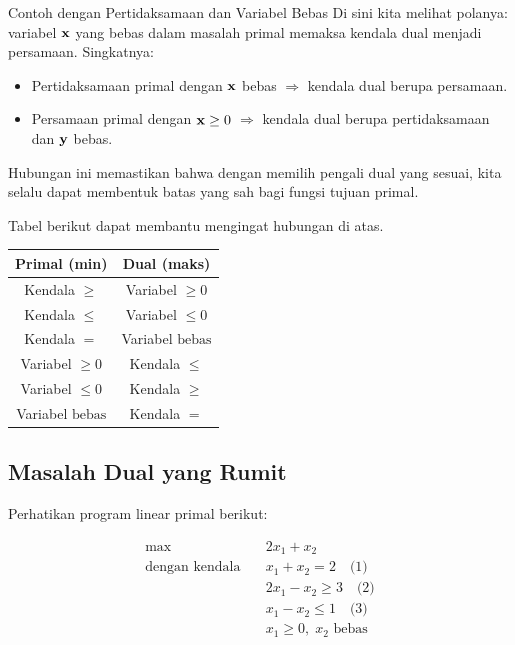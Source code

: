 \begin{example}{Contoh dengan Pertidaksamaan dan Variabel Bebas}{}
Di sini kita melihat polanya: variabel $\mathbf{x}$ yang bebas dalam masalah primal memaksa kendala dual menjadi persamaan. Singkatnya:
\begin{itemize}
\item Pertidaksamaan primal dengan $\mathbf{x}$ bebas $\Rightarrow$ kendala dual berupa persamaan.
\item Persamaan primal dengan $\mathbf{x} \geq 0$ $\Rightarrow$ kendala dual berupa pertidaksamaan dan $\mathbf{y}$ bebas.
\end{itemize}

Hubungan ini memastikan bahwa dengan memilih pengali dual yang sesuai, kita selalu dapat membentuk batas yang sah bagi fungsi tujuan primal.

Tabel berikut dapat membantu mengingat hubungan di atas.\\

\begin{center}
\begin{tabular}{cc}
\toprule
\textbf{Primal (min)}       & \textbf{Dual (maks)}      \\
\midrule
Kendala \(\geq\)           & Variabel \(\geq 0\)      \\
Kendala \(\leq\)           & Variabel \(\leq 0\)      \\
Kendala \(=\)               & Variabel \(\text{bebas}\) \\
Variabel \(\geq 0\)        & Kendala \(\leq\)         \\
Variabel \(\leq 0\)        & Kendala \(\geq\)         \\
Variabel \(\text{bebas}\)  & Kendala \(=\)             \\
\bottomrule
\end{tabular}
\par{}\label{tab:duality-tab01}%

\end{center}
\end{example}

\subsection*{Masalah Dual yang Rumit}
\label{example:complicated-dual}
Perhatikan program linear primal berikut:
\par\noindent
\begin{tcolorbox}[title=Primal (P), colback=blue!5, colframe=blue!60!black, sharp corners=south]
\[
\begin{aligned}
\max\quad & 2x_1 + x_2 \\
\text{dengan kendala} \quad
& x_1 + x_2 = 2 \quad \text{(1)} \\
& 2x_1 - x_2 \geq 3 \quad \text{(2)} \\
& x_1 - x_2 \leq 1 \quad \text{(3)} \\
& x_1 \geq 0, \; x_2 \text{ bebas}
\end{aligned}
\]
\end{tcolorbox}

